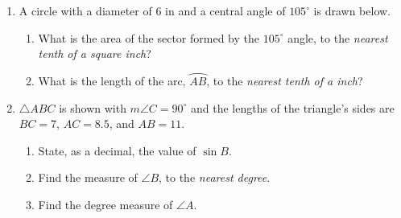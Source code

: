 \documentclass[12pt, twoside]{article}
\begin{document}
\begin{enumerate}
  \item A circle with a diameter of 6 in and a central angle of $105^\circ$ is drawn below.
     \begin{enumerate}
       \item What is the area of the sector formed by the $105^\circ$ angle, to the \emph{nearest tenth of a square inch}?\\[0.25cm]
        \vspace{1cm}
       \item What is the length of the arc, $\wideparen{AB}$, to the \emph{nearest tenth of a inch}?
     \end{enumerate}

\newpage

  \item $\triangle ABC$ is shown with $m\angle C=90^\circ$ and the lengths of the triangle's sides are $BC=7$, $AC=8.5$, and $AB=11$.
  \begin{multicols}{2}
        \begin{enumerate}
        \item State, as a decimal, the value of $\sin B$. \vspace{1.25cm}
        \item Find the measure of $\angle B$, to the \emph{nearest degree}. \vspace{1.25cm}
        \item Find the degree measure of $\angle A$.
      \end{enumerate}
    \end{multicols}
    \vspace{1.5cm}


\end{enumerate}
\end{document}
